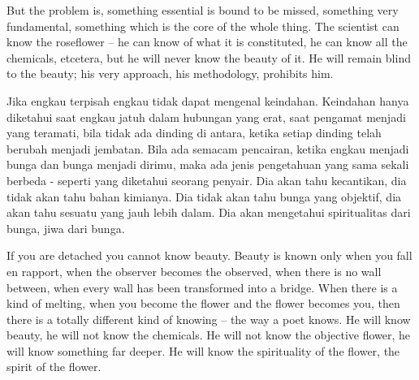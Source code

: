 \english
But the problem is, something essential is bound to be missed, something very
fundamental, something which is the core of the whole thing. The scientist can know the roseflower -- he can know of what it is constituted, he can know all the chemicals, etcetera, but he will never know the beauty of it. He will remain blind to the beauty; his very approach, his methodology, prohibits him.

\bahasa
Jika engkau terpisah engkau tidak dapat mengenal keindahan. Keindahan hanya diketahui saat engkau jatuh dalam hubungan yang erat, saat pengamat menjadi yang teramati, bila tidak ada dinding di antara, ketika setiap dinding telah berubah menjadi jembatan. Bila ada semacam pencairan, ketika engkau menjadi bunga dan bunga menjadi dirimu, maka ada jenis pengetahuan yang sama sekali berbeda - seperti yang diketahui seorang penyair. Dia akan tahu kecantikan, dia tidak akan tahu bahan kimianya. Dia tidak akan tahu bunga yang objektif, dia akan tahu sesuatu yang jauh lebih dalam. Dia akan mengetahui spiritualitas dari bunga, jiwa dari bunga.

\english
If you are detached you cannot know beauty. Beauty is known only when you fall en rapport, when the observer becomes the observed, when there is no wall between, when every wall has been transformed into a bridge. When there is a kind of melting, when you become the flower and the flower becomes you, then there is a totally different kind of knowing -- the way a poet knows. He will know beauty, he will not know the chemicals. He will not know the objective flower, he will know something far deeper. He will know the spirituality of the flower, the spirit of the flower.

